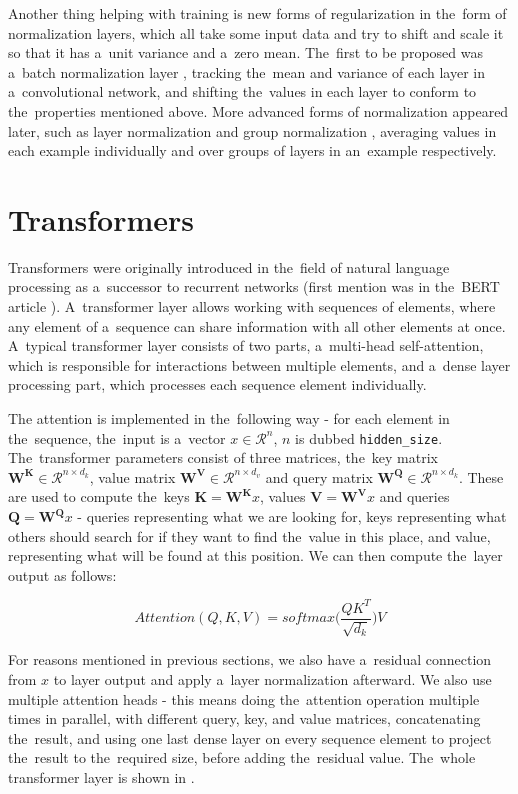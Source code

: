 Another thing helping with training is new forms of regularization in the~form of normalization layers, which all take some input data and try to shift and scale it so that it has a~unit variance and a~zero mean. The~first to be proposed was a~batch normalization layer \citep{batch_norm}, tracking the~mean and variance of each layer in a~convolutional network, and shifting the~values in each layer to conform to the~properties mentioned above. More advanced forms of normalization appeared later, such as layer normalization \citep{layer_norm} and group normalization \citep{group_norm}, averaging values in each example individually and over groups of layers in an~example respectively.


\section{Transformers}

Transformers were originally introduced in the~field of natural language processing as a~successor to recurrent networks (first mention was in the~BERT article \citep{BERT}). A~transformer layer allows working with sequences of elements, where any element of a~sequence can share information with all other elements at once. A~typical transformer layer consists of two parts, a~multi-head self-attention, which is responsible for interactions between multiple elements, and a~dense layer processing part, which processes each sequence element individually.

The attention is implemented in the~following way - for each element in the~sequence, the~input is a~vector $x \in \mathcal{R}^n$, $n$ is dubbed \texttt{hidden\_size}. The~transformer parameters consist of three matrices, the~key matrix $\mathbf{W^K} \in \mathcal{R}^{n \times d_k}$, value matrix $\mathbf{W^V} \in \mathcal{R}^{n \times d_v}$ and query matrix $\mathbf{W^Q} \in \mathcal{R}^{n \times d_k}$. These are used to compute the~keys $\mathbf{K}=\mathbf{W^K}x$, values $\mathbf{V}=\mathbf{W^V}x$ and queries $\mathbf{Q}=\mathbf{W^Q}x$ - queries representing what we are looking for, keys representing what others should search for if they want to find the~value in this place, and value, representing what will be found at this position. We can then compute the~layer output as follows:

$$Attention(Q, K, V) = softmax \biggl( \frac{QK^T}{\sqrt{d_k}} \biggl) V$$

For reasons mentioned in previous sections, we also have a~residual connection from $x$ to layer output and apply a~layer normalization afterward. We also use multiple attention heads - this means doing the~attention operation multiple times in parallel, with different query, key, and value matrices, concatenating the~result, and using one last dense layer on every sequence element to project the~result to the~required size, before adding the~residual value. The~whole transformer layer is shown in .

